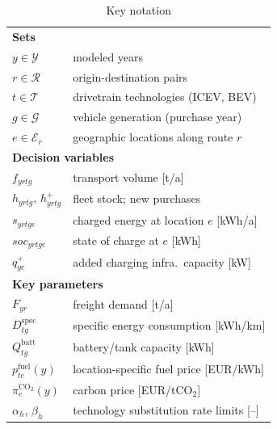 \documentclass[conference]{IEEEtran}
\begin{document}
\begin{table}[htbp]
\caption{Key notation}
\label{tab:nomenclature}
\begin{center}
\footnotesize
\begin{tabular}{@{}ll@{}}
\toprule
\multicolumn{2}{l}{\textbf{Sets}} \\
$y \in \mathcal{Y}$ & modeled years \\
$r \in \mathcal{R}$ & origin-destination pairs \\
$t \in \mathcal{T}$ & drivetrain technologies (ICEV, BEV) \\
$g \in \mathcal{G}$ & vehicle generation (purchase year) \\
$e \in \mathcal{E}_r$ & geographic locations along route $r$ \\
\midrule
\multicolumn{2}{l}{\textbf{Decision variables}} \\
$f_{yrtg}$ & transport volume [t/a] \\
$h_{yrtg}$, $h^+_{yrtg}$ & fleet stock; new purchases \\
$s_{yrtge}$ & charged energy at location $e$ [kWh/a] \\
$soc_{yrtge}$ & state of charge at $e$ [kWh] \\
$q^+_{ye}$ & added charging infra.\ capacity [kW] \\
\midrule
\multicolumn{2}{l}{\textbf{Key parameters}} \\
$F_{yr}$ & freight demand [t/a] \\
$D^{\mathrm{spec}}_{tg}$ & specific energy consumption [kWh/km] \\
$Q^{\mathrm{batt}}_{tg}$ & battery/tank capacity [kWh] \\
$p^{\mathrm{fuel}}_{te}(y)$ & location-specific fuel price [EUR/kWh] \\
$\pi^{\mathrm{CO_2}}_e(y)$ & carbon price [EUR/tCO$_2$] \\
$\alpha_h$, $\beta_h$ & technology substitution rate limits [--] \\
\bottomrule
\end{tabular}
\end{center}
\end{table}
\end{document}

